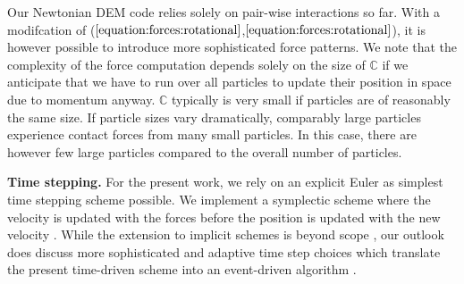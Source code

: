 Our Newtonian DEM code relies solely on pair-wise interactions so far. 
With a modifcation of
($\ref{equation:forces:rotational}$,$\ref{equation:forces:rotational}$), it is
however possible to introduce more sophisticated force patterns.
We note that the complexity of the force computation depends solely on the size
of $\mathbb{C}$ if we anticipate that we have to run over all particles to
update their position in space due to momentum anyway.
$\mathbb{C}$ typically is very small if particles are of reasonably the same
size. 
If particle sizes vary dramatically, comparably large particles experience
contact forces from many small particles.
In this case, there are however few large particles compared to the overall
number of particles.


{\bf Time stepping.}
For the present work, we rely on an explicit Euler as simplest time stepping
scheme possible.
We implement a symplectic scheme where the velocity is updated with the forces
before the position is updated with the new velocity \cite{Samiei,37}. 
While the extension to implicit schemes is beyond scope \cite{xxx}, our outlook
does discuss more sophisticated and adaptive time step choices which translate
the present time-driven scheme into an event-driven algorithm \cite{xxx}.

